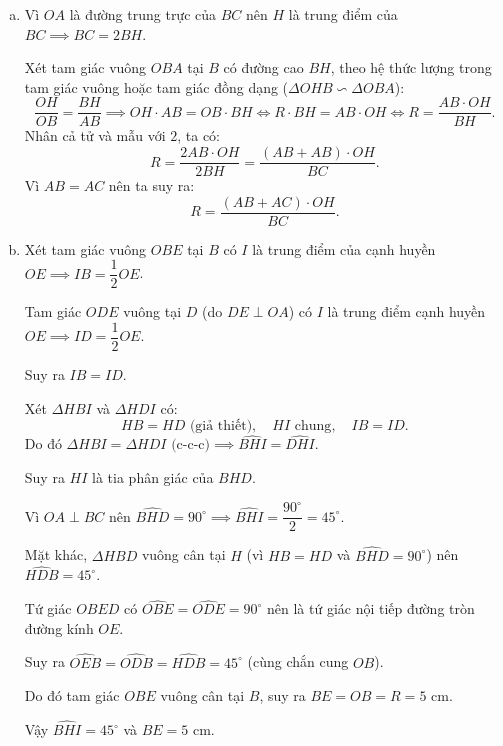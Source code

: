 \begin{bt}
{\begin{enumerate}[a)]
			Lại có $OB = OC = R$ nên $OA$ là đường trung trực của đoạn thẳng $BC$, suy ra $OA \perp BC$ tại $H$.
			
			Tứ giác $OBAC$ có $\widehat{ABO} + \widehat{ACO} = 90^\circ + 90^\circ = 180^\circ$, do đó $OBAC$ là tứ giác nội tiếp đường tròn đường kính $OA$.
			\item Vì $OA$ là đường trung trực của $BC$ nên $H$ là trung điểm của $BC \implies BC = 2BH$.
			
			Xét tam giác vuông $OBA$ tại $B$ có đường cao $BH$, theo hệ thức lượng trong tam giác vuông hoặc tam giác đồng dạng ($\Delta OHB \backsim \Delta OBA$):
			$$\dfrac{OH}{OB} = \dfrac{BH}{AB} \implies OH \cdot AB = OB \cdot BH \iff R \cdot BH = AB \cdot OH \iff R = \dfrac{AB \cdot OH}{BH}.$$
			Nhân cả tử và mẫu với $2$, ta có:
			$$R = \dfrac{2AB \cdot OH}{2BH} = \dfrac{(AB + AB) \cdot OH}{BC}.$$
			Vì $AB = AC$ nên ta suy ra:
			$$R = \dfrac{(AB + AC) \cdot OH}{BC}.$$
			\item Xét tam giác vuông $OBE$ tại $B$ có $I$ là trung điểm của cạnh huyền $OE \implies IB = \dfrac{1}{2}OE$.
			
			Tam giác $ODE$ vuông tại $D$ (do $DE \perp OA$) có $I$ là trung điểm cạnh huyền $OE \implies ID = \dfrac{1}{2}OE$.
			
			Suy ra $IB = ID$.
			
			Xét $\Delta HBI$ và $\Delta HDI$ có:
			$$HB = HD\text{ (giả thiết)},\quad HI\text{ chung},\quad IB = ID.$$
			Do đó $\Delta HBI = \Delta HDI\text{ (c-c-c)} \implies \widehat{BHI} = \widehat{DHI}$.
			
			Suy ra $HI$ là tia phân giác của $\widehat{BHD}$.
			
			Vì $OA \perp BC$ nên $\widehat{BHD} = 90^\circ \implies \widehat{BHI} = \dfrac{90^\circ}{2} = 45^\circ$.
			
			Mặt khác, $\Delta HBD$ vuông cân tại $H$ (vì $HB = HD$ và $\widehat{BHD} = 90^\circ$) nên $\widehat{HDB} = 45^\circ$.
			
			Tứ giác $OBED$ có $\widehat{OBE} = \widehat{ODE} = 90^\circ$ nên là tứ giác nội tiếp đường tròn đường kính $OE$.
			
			Suy ra $\widehat{OEB} = \widehat{ODB} = \widehat{HDB} = 45^\circ$ (cùng chắn cung $OB$).
			
			Do đó tam giác $OBE$ vuông cân tại $B$, suy ra $BE = OB = R = 5\text{ cm}$.
			
			Vậy $\widehat{BHI} = 45^\circ$ và $BE = 5\text{ cm}$.
		\end{enumerate}
	}
\end{bt}

